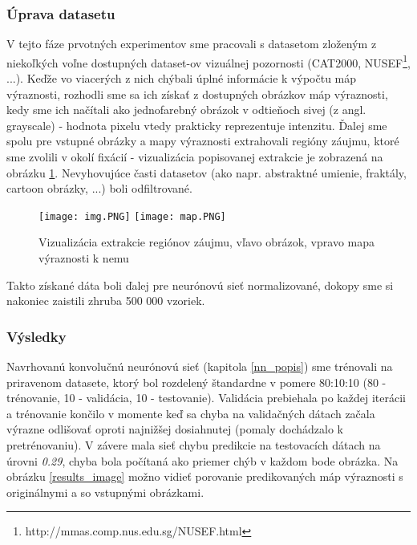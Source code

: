 \subsubsection{Úprava datasetu}
\label{dataset}

V tejto fáze prvotných experimentov sme pracovali s datasetom zloženým z niekoľkých voľne dostupných dataset-ov vizuálnej pozornosti (CAT2000\cite{borji2015cat2000}, NUSEF\footnote{http://mmas.comp.nus.edu.sg/NUSEF.html}, ...).
Keďže vo viacerých z nich chýbali úplné informácie k výpočtu máp výraznosti, rozhodli sme sa ich získať z dostupných obrázkov máp výraznosti, kedy sme ich načítali ako jednofarebný  obrázok v odtieňoch sivej (z angl. grayscale) - hodnota pixelu vtedy prakticky reprezentuje intenzitu. Ďalej sme spolu pre vstupné obrázky a mapy výraznosti extrahovali regióny záujmu, ktoré sme zvolili v okolí fixácií - vizualizácia popisovanej extrakcie je zobrazená na obrázku \ref{roi_image}. Nevyhovujúce časti datasetov (ako napr. abstraktné umienie, fraktály, cartoon obrázky, ...) boli odfiltrované.

\begin{figure}[H]
	\begin{center}
		\texttt{[image: img.PNG]}
		\texttt{[image: map.PNG]}
		\caption[Vizualizácia extrakcie regiónov záujmu]{
			Vizualizácia extrakcie regiónov záujmu, vľavo obrázok, vpravo mapa výraznosti k nemu
		}\label{roi_image}
	\end{center}
\end{figure}

Takto získané dáta boli ďalej pre neurónovú sieť normalizované, dokopy sme si nakoniec zaistili zhruba 500 000 vzoriek.
\newline

\subsubsection{Výsledky}

Navrhovanú konvolučnú neurónovú sieť (kapitola \ref{nn_popis}) sme trénovali na priravenom datasete, ktorý bol rozdelený štandardne v pomere 80:10:10 (80 - trénovanie, 10 - validácia, 10 - testovanie). Validácia prebiehala po každej iterácii a trénovanie končilo v momente keď sa chyba na validačných dátach začala výrazne odlišovať oproti najnižšej dosiahnutej (pomaly dochádzalo k pretrénovaniu). V závere mala sieť chybu predikcie na testovacích dátach na úrovni \textit{0.29}, chyba bola počítaná ako priemer chýb v každom bode obrázka. Na obrázku \ref{results_image} možno vidieť porovanie predikovaných máp výraznosti s originálnymi a so vstupnými obrázkami. 

